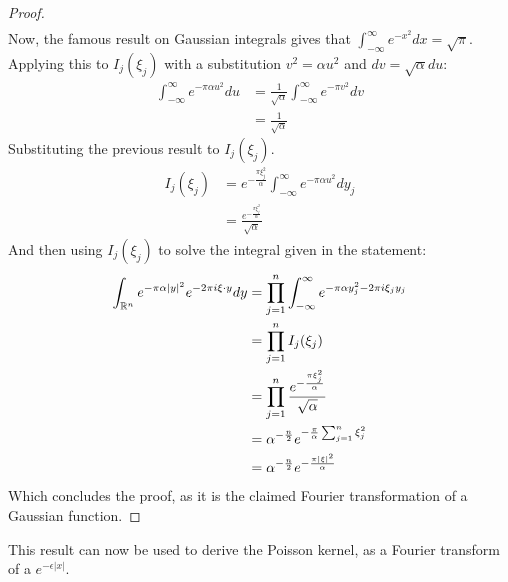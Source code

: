 \begin{proof}
\begin{gather*}
    \end{gather*}
    Now, the famous result on Gaussian integrals gives that $\int_{-\infty}^\infty e^{-x^2}dx=\sqrt{\pi}$. Applying this to $I_j(\xi_j)$ with a substitution $v^2=\alpha u^2$ and $dv=\sqrt{\alpha}du$:
    \begin{align*}
        \int_{-\infty}^\infty e^{-\pi\alpha u^2}du&=\frac{1}{\sqrt{\alpha}}\int_{-\infty}^\infty e^{-\pi v^2}dv \\
        &=\frac{1}{\sqrt{\alpha}}
    \end{align*}
    Substituting the previous result to $I_j(\xi_j)$.
    \begin{align*}
        I_j(\xi_j)&=e^{-\frac{\pi \xi_j^2}{\alpha}}\int_{-\infty}^\infty e^{-\pi\alpha u^2}dy_j \\
        &=\frac{e^{-\frac{\pi \xi_j^2}{\alpha}}}{\sqrt{\alpha}}
    \end{align*}
    And then using $I_j(\xi_j)$ to solve the integral given in the statement:
    \begin{align*}
        \int_{\mathbb R^n}e^{-\pi\alpha|y|^2}e^{-2\pi i\xi\cdot y}dy&=\prod_{j=1}^n\int_{-\infty}^\infty e^{-\pi\alpha y_j^2-2\pi i\xi_jy_j} \\
        &=\prod_{j=1}^n I_j(\xi_j) \\
        &=\prod_{j=1}^n\frac{e^{-\frac{\pi \xi_j^2}{\alpha}}}{\sqrt{\alpha}} \\
        &=\alpha^{-\frac{n}{2}}e^{-\frac{\pi}{\alpha}\sum_{j=1}^n\xi_j^2} \\
        &=\alpha^{-\frac{n}{2}}e^{-\frac{\pi|\xi|^2}{\alpha}}
    \end{align*}
    Which concludes the proof, as it is the claimed Fourier transformation of a Gaussian function.
\end{proof}

This result can now be used to derive the Poisson kernel, as a Fourier transform of a $e^{-\epsilon|x|}$.

